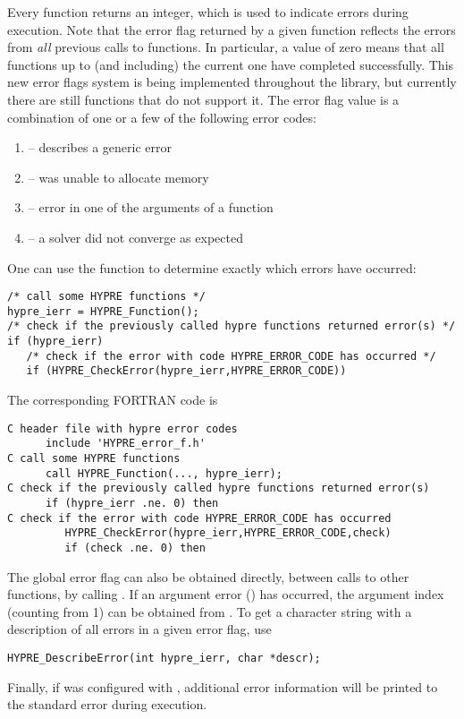 Every \hypre{} function returns an integer, which is used to indicate errors
during execution.  Note that the error flag returned by a given function
reflects the errors from {\em all} previous calls to \hypre{} functions.  In
particular, a value of zero means that all \hypre{} functions up to (and
including) the current one have completed successfully.  This new error flags
system is being implemented throughout the library, but currently there are
still functions that do not support it.  The error flag value is a combination
of one or a few of the following error codes:
\begin{enumerate}
\item {} -- describes a generic error
\item {} -- \hypre{} was unable to allocate memory
\item {} -- error in one of the arguments of a \hypre{} function
\item {} -- a \hypre{} solver did not converge as expected
\end{enumerate}
One can use the  function to determine exactly which
errors have occurred:
\begin{display} \begin{verbatim}
/* call some HYPRE functions */
hypre_ierr = HYPRE_Function();
/* check if the previously called hypre functions returned error(s) */
if (hypre_ierr)
   /* check if the error with code HYPRE_ERROR_CODE has occurred */
   if (HYPRE_CheckError(hypre_ierr,HYPRE_ERROR_CODE))
\end{verbatim} \end{display}
The corresponding FORTRAN code is
\begin{display} \begin{verbatim}
C header file with hypre error codes
      include 'HYPRE_error_f.h'
C call some HYPRE functions
      call HYPRE_Function(..., hypre_ierr);
C check if the previously called hypre functions returned error(s)
      if (hypre_ierr .ne. 0) then
C check if the error with code HYPRE_ERROR_CODE has occurred
         HYPRE_CheckError(hypre_ierr,HYPRE_ERROR_CODE,check)
         if (check .ne. 0) then
\end{verbatim} \end{display}
The global error flag can also be obtained directly, between calls to other
\hypre{} functions, by calling .  If an argument error
() has occurred, the argument index (counting from 1)
can be obtained from .  To get a character string
with a description of all errors in a given error flag, use
\begin{display} \begin{verbatim}
HYPRE_DescribeError(int hypre_ierr, char *descr);
\end{verbatim} \end{display}
Finally, if \hypre{} was configured with , additional
error information will be printed to the standard error during execution.

